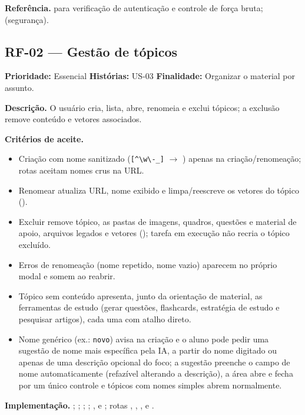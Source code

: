 \textbf{Referência.} \cite{owasp_asvs_2021} para verificação de autenticação e controle de força bruta; \cite{iso_25010} (segurança).

\subsection{RF-02 --- Gestão de tópicos}

\textbf{Prioridade:} Essencial \quad \textbf{Histórias:} US-03 \quad \textbf{Finalidade:} Organizar o material por assunto.

\textbf{Descrição.} O usuário cria, lista, abre, renomeia e exclui tópicos; a exclusão remove conteúdo e vetores associados.

\textbf{Critérios de aceite.}
\begin{itemize}
    \item Criação com nome sanitizado (\texttt{[\textasciicircum{}\textbackslash{}w\textbackslash{}-\_]} $\rightarrow$ \texttt{\seqcod{\_}}) apenas na criação/renomeação; rotas aceitam nomes crus na URL.
    \item Renomear atualiza URL, nome exibido e limpa/reescreve os vetores do tópico (\texttt{}).
    \item Excluir remove tópico, as pastas de imagens, quadros, questões e material de apoio, arquivos legados e vetores (\texttt{}); tarefa em execução não recria o tópico excluído.
    \item Erros de renomeação (nome repetido, nome vazio) aparecem no próprio modal e somem ao reabrir.
    \item Tópico sem conteúdo apresenta, junto da orientação de material, as ferramentas de estudo (gerar questões, flashcards, estratégia de estudo e pesquisar artigos), cada uma com atalho direto.
    \item Nome genérico (ex.: \texttt{novo}) avisa na criação e o aluno pode pedir uma sugestão de nome mais específica pela IA, a partir do nome digitado ou apenas de uma descrição opcional do foco; a sugestão preenche o campo de nome automaticamente (refazível alterando a descrição), a área abre e fecha por um único controle e tópicos com nomes simples abrem normalmente.
\end{itemize}

\textbf{Implementação.} ; ; ; ; ,  e ; rotas \texttt{}, \texttt{}, \texttt{}, \texttt{} e \texttt{}.

